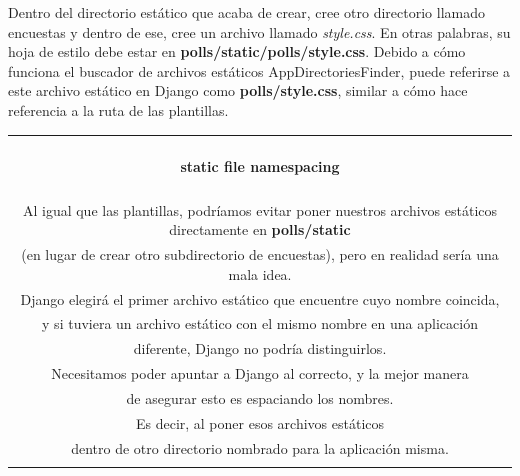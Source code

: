 \documentclass[10pt]{article}
\newcommand{\django}[1]{{\textcolor{G}{Django} #1}}
\begin{document}
Dentro del directorio estático que acaba de crear, cree otro directorio llamado encuestas y dentro de ese, cree un archivo llamado \textit{style.css}. En otras palabras, su hoja de estilo debe estar en \textbf{polls/static/polls/style.css}. Debido a cómo funciona el buscador de archivos estáticos \textcolor{G}{AppDirectoriesFinder}, puede referirse a este archivo estático en \django{} como \textbf{polls/style.css}, similar a cómo hace referencia a la ruta de las plantillas.
\begin{table}[H]
	\begin{tabular}{||c||}
	\hline \\
	\begin{Large}
	\textbf{static file namespacing}
	\end{Large}
	\\\\		
Al igual que las plantillas, podríamos evitar poner nuestros archivos estáticos directamente en \textbf{polls/static}\\ (en lugar de crear otro subdirectorio de encuestas), pero en realidad sería una mala idea.\\ \django{} elegirá el primer archivo estático que encuentre cuyo nombre coincida,\\ y si tuviera un archivo estático con el mismo nombre en una aplicación\\ diferente, \django no podría distinguirlos.\\ Necesitamos poder apuntar a Django al correcto, y la mejor manera\\ de asegurar esto es espaciando los nombres.\\ Es decir, al poner esos archivos estáticos \\dentro de otro directorio nombrado para la aplicación misma.
	\\\\ \hline 	
	\end{tabular}			
\end{table}		
\end{document}
